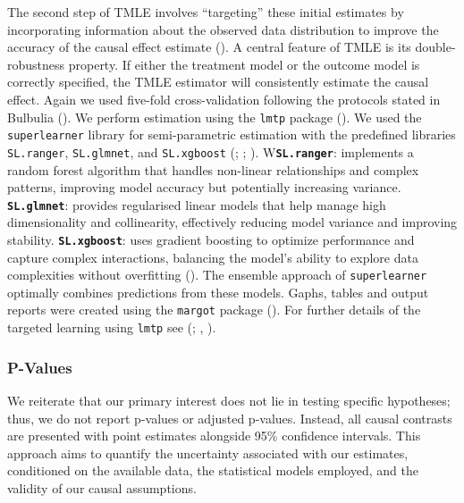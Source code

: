 \documentclass[
  single column]{article}
\begin{document}
The second step of TMLE involves ``targeting'' these initial estimates
by incorporating information about the observed data distribution to
improve the accuracy of the causal effect estimate
(). A central
feature of TMLE is its double-robustness property. If either the
treatment model or the outcome model is correctly specified, the TMLE
estimator will consistently estimate the causal effect. Again we used
five-fold cross-validation following the protocols stated in Bulbulia
(). We perform estimation
using the \texttt{lmtp} package (). We used the \texttt{superlearner} library for
semi-parametric estimation with the predefined libraries
\texttt{SL.ranger}, \texttt{SL.glmnet}, and \texttt{SL.xgboost}
(;
;
).
W\textbf{\texttt{SL.ranger}}: implements a random forest algorithm that
handles non-linear relationships and complex patterns, improving model
accuracy but potentially increasing variance.
\textbf{\texttt{SL.glmnet}}: provides regularised linear models that
help manage high dimensionality and collinearity, effectively reducing
model variance and improving stability. \textbf{\texttt{SL.xgboost}}:
uses gradient boosting to optimize performance and capture complex
interactions, balancing the model's ability to explore data complexities
without overfitting (). The ensemble approach of \texttt{superlearner} optimally
combines predictions from these models. Gaphs, tables and output reports
were created using the \texttt{margot} package
(). For further details of the
targeted learning using \texttt{lmtp} see
(;
,
).

\subsubsection{P-Values}\label{p-values}

We reiterate that our primary interest does not lie in testing specific
hypotheses; thus, we do not report p-values or adjusted p-values.
Instead, all causal contrasts are presented with point estimates
alongside 95\% confidence intervals. This approach aims to quantify the
uncertainty associated with our estimates, conditioned on the available
data, the statistical models employed, and the validity of our causal
assumptions.
\end{document}
